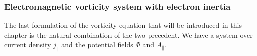 \subsubsection{Electromagnetic vorticity system with electron inertia}
The last formulation of the vorticity equation that will be introduced in this chapter is the natural combination of the two precedent. We have a system over current density  $j_\parallel$ and the potential fields $\Phi$ and $A_\parallel$. 
%
%
